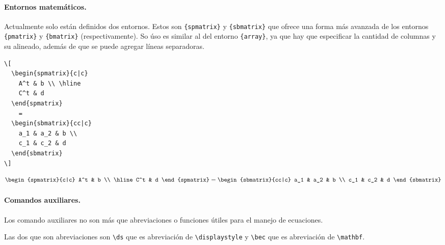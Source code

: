 \documentclass[11pt]{article}
\begin{document}
\paragraph{Entornos matemáticos.} Actualmente solo están definidos dos entornos. Estos son \verb|{spmatrix}| y \verb|{sbmatrix}| que ofrece una forma más avanzada de los entornos \verb|{pmatrix}| y \verb|{bmatrix}| (respectivamente). So úso es similar al del entorno \verb|{array}|, ya que hay que especificar la cantidad de 
columnas y su alineado, además de que se puede agregar líneas separadoras.
\begin{center}
\begin{minipage}{0.45\textwidth}
\begin{verbatim}\[
  \begin{spmatrix}{c|c}
    A^t & b \\ \hline
    C^t & d
  \end{spmatrix}
    = 
  \begin{sbmatrix}{cc|c}
    a_1 & a_2 & b \\ 
    c_1 & c_2 & d
  \end{sbmatrix}
\]\end{verbatim}
\end{minipage}
\begin{minipage}{0.45\textwidth}
  \[
    \begin{spmatrix}{c|c}
      A^t & b \\ \hline
      C^t & d
    \end{spmatrix}
      = 
    \begin{sbmatrix}{cc|c}
      a_1 & a_2 & b \\ 
      c_1 & c_2 & d
    \end{sbmatrix}
  \]
  \end{minipage}
\end{center}


\paragraph{Comandos auxiliares.} Los comando auxiliares no son más que abreviaciones o funciones útiles para el manejo de ecuaciones.

Las dos que son abreviaciones son \verb|\ds| que es abreviación de \verb|\displaystyle| y \verb|\bec| que es abreviación de \verb|\mathbf|.
\end{document}
